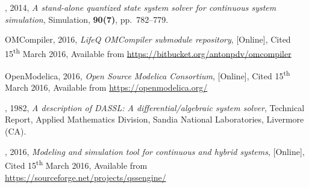 \documentclass[10pt]{article}
\begin{document}
{\footnotesize
\begin{thebibliography}{10}

, 2014, {\em A stand-alone quantized state system solver for continuous system simulation}, Simulation, {\bf{90(7)}}, pp.\, 782--779.


 {\sc OMCompiler}, 2016, {\em LifeQ OMCompiler submodule repository}, [Online], Cited 15\textsuperscript{th} March 2016, Available from {\url{https://bitbucket.org/antonpdv/omcompiler}}

 {\sc OpenModelica}, 2016, {\em Open Source Modelica Consortium}, [Online], Cited 15\textsuperscript{th} March 2016, Available from {\url{https://openmodelica.org/}}

, 1982, {\em A description of DASSL: A differential/algebraic system solver}, Technical Report, Applied Mathematics Division, Sandia National Laboratories, Livermore (CA).

, 2016, {\em Modeling and simulation tool for continuous and hybrid systems}, [Online], Cited 15\textsuperscript{th} March 2016, Available from {\url{https://sourceforge.net/projects/qssengine/}}


\end{thebibliography}}
\end{document}
